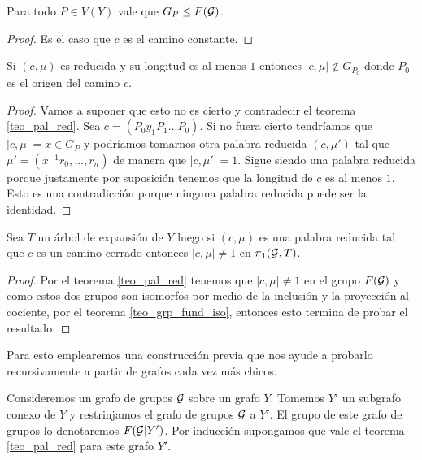 \documentclass[tesis.tex]{subfiles}
\begin{document}
\begin{coro}\label{coro_pal_red_1}
	Para todo $P \in V(Y)$ vale que $G_P \le F({\cal G})$.
\end{coro}
\begin{proof}
	Es el caso que $c$ es el camino constante.
\end{proof}

\begin{coro}\label{coro_pal_red_2}
	Si $(c, \mu)$ es reducida y su longitud es al menos $1$ entonces $|c, \mu| \notin G_{P_0}$ donde $P_0$ es el origen del camino $c$.
\end{coro}
\begin{proof}
	Vamos a suponer que esto no es cierto y contradecir el teorema \ref{teo_pal_red}.
	Sea $c = (P_0y_1P_1\dots P_0)$.
	Si no fuera cierto tendríamos que $|c,\mu| = x \in G_P$ y podríamos tomarnos otra palabra reducida $(c,\mu')$ tal que $\mu' = (x^{-1}r_0, \dots, r_n)$ de manera que $|c,\mu'| = 1$.
	Sigue siendo una palabra reducida porque justamente por suposición tenemos que la longitud de $c$ es al menos $1$.
	Esto es una contradicción porque ninguna palabra reducida puede ser la identidad.
\end{proof}

\begin{coro}\label{coro_pal_red_3}
	Sea $T$ un árbol de expansión de $Y$ luego si $(c, \mu)$ es una palabra reducida tal que $c$ es un camino cerrado entonces $|c,\mu| \neq 1$ en $\pi_1({\cal G}, T)$. 
\end{coro}
\begin{proof}
	Por el teorema \ref{teo_pal_red} tenemos que $|c,\mu| \neq 1$ en el grupo $F({\cal G})$ y como estos dos grupos son isomorfos por medio de la inclusión y la proyección al cociente, por el teorema \ref{teo_grp_fund_iso}, entonces esto termina de probar el resultado.
\end{proof}

Para esto emplearemos una construcción previa que nos ayude a probarlo recursivamente a partir de grafos cada vez más chicos.

Consideremos un grafo de grupos ${\cal G}$ sobre un grafo $Y$. 
Tomemos $Y'$ un subgrafo conexo de $Y$ y restrinjamos el grafo de grupos ${\cal G}$ a $Y'$. 
El grupo de este grafo de grupos lo denotaremos $F({\cal G} | Y')$.
Por inducción supongamos que vale el teorema \ref{teo_pal_red} para este grafo $Y'$.
\end{document}
